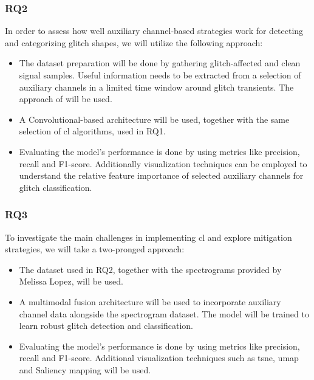 \subsubsection{RQ2}
In order to assess how well auxiliary channel-based strategies work for detecting and categorizing glitch shapes, we will utilize the following approach:
\begin{itemize}
    \item The dataset preparation will be done by gathering glitch-affected and clean signal samples. Useful information needs to be extracted from a selection of auxiliary channels in a limited time window around glitch transients. The approach of \citep{colgan2020efficient} will be used. 
    \item A Convolutional-based architecture will be used, together with the same selection of \acrshort{cl} algorithms, used in RQ1. 
    \item Evaluating the model's performance is done by using metrics like precision, recall and F1-score. Additionally visualization techniques can be employed to understand the relative feature importance of selected auxiliary channels for glitch classification. 
\end{itemize}
\subsubsection{RQ3}
To investigate the main challenges in implementing \acrfull{cl} and explore mitigation strategies, we will take a two-pronged approach: 
\begin{itemize}
    \item The dataset used in RQ2, together with the spectrograms provided by Melissa Lopez, will be used. 
    \item A multimodal fusion architecture will be used to incorporate auxiliary channel data alongside the spectrogram dataset. The model will be trained to learn robust glitch detection and classification. 
    \item Evaluating the model's performance is done by using metrics like precision, recall and F1-score. Additional visualization techniques such as \acrshort{tsne}, \acrshort{umap} and Saliency mapping will be used. 
\end{itemize}